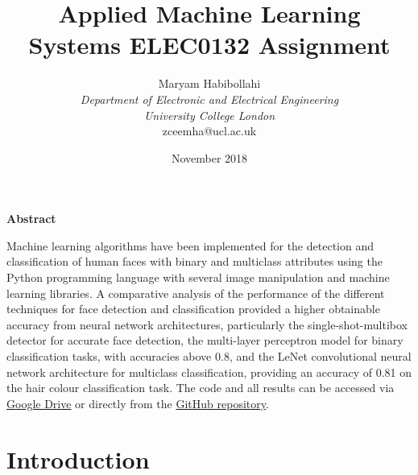 \documentclass[conference]{IEEEtran}
\begin{document}
\def\code#1{\texttt{#1}}

\title{Applied Machine Learning\\
 Systems ELEC0132 Assignment}
\author{\large Maryam Habibollahi\\ \textit{Department of Electronic and Electrical Engineering}\\ \textit{University College London}\\ zceemha@ucl.ac.uk}
\date{November 2018}
\maketitle

\setcounter{page}{1} 

\begin{center} \large \textbf{Abstract} \end{center}

Machine learning algorithms have been implemented for the detection and classification of human faces with binary and multiclass attributes using the Python programming language with several image manipulation and machine learning libraries. A comparative analysis of the performance of the different techniques for face detection and classification provided a higher obtainable accuracy from neural network architectures, particularly the single-shot-multibox detector for accurate face detection, the multi-layer perceptron model for binary classification tasks, with accuracies above 0.8, and the LeNet convolutional neural network architecture for multiclass classification, providing an accuracy of 0.81 on the hair colour classification task. The code and all results can be accessed via  \href{https://drive.google.com/file/d/1WXVxgsFRLl0BnZnKn3MUFrzJA3oxCLS6/view?usp=sharing}{Google Drive} or directly from the  \href{https://github.com/maryamhb/AMLSassignment}{GitHub repository}.

\section{Introduction} \label{s-intro}

\end{document}
